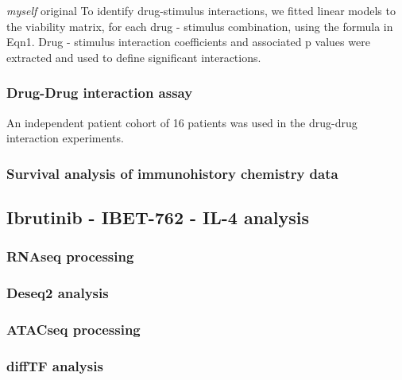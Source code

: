 \documentclass[11pt, a4paper, twosided]{book}
\begin{document}
\emph{myself} original
To identify drug-stimulus interactions, we fitted linear models to the viability matrix, for each drug - stimulus combination, using the formula in Eqn1. Drug - stimulus interaction coefficients and associated p values were extracted and used to define significant interactions.

\hypertarget{drug-drug-interaction-assay}{%
\subsubsection{Drug-Drug interaction assay}\label{drug-drug-interaction-assay}}

An independent patient cohort of 16 patients was used in the drug-drug interaction experiments.

\hypertarget{survival-analysis-of-immunohistory-chemistry-data}{%
\subsubsection{Survival analysis of immunohistory chemistry data}\label{survival-analysis-of-immunohistory-chemistry-data}}

\hypertarget{ibrutinib---ibet-762---il-4-analysis}{%
\subsection{Ibrutinib - IBET-762 - IL-4 analysis}\label{ibrutinib---ibet-762---il-4-analysis}}

\hypertarget{rnaseq-processing}{%
\subsubsection{RNAseq processing}\label{rnaseq-processing}}

\hypertarget{deseq2-analysis}{%
\subsubsection{Deseq2 analysis}\label{deseq2-analysis}}

\hypertarget{atacseq-processing-1}{%
\subsubsection{ATACseq processing}\label{atacseq-processing-1}}

\hypertarget{difftf-analysis}{%
\subsubsection{diffTF analysis}\label{difftf-analysis}}
\end{document}
